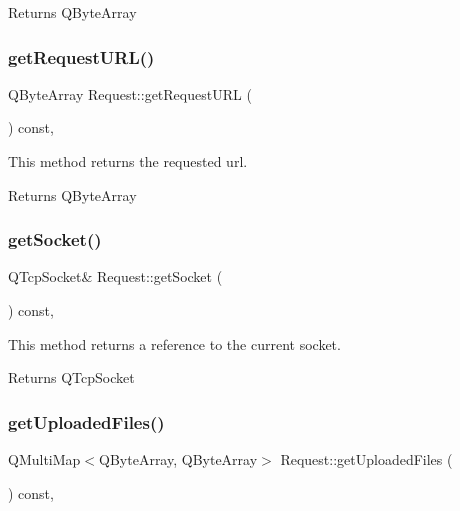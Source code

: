 \begin{DoxyReturn}{Returns}
Q\+Byte\+Array 
\end{DoxyReturn}
\mbox{\label{class_request_a48d3b2a3579011b0599e721fdb867b27}} 
\subsubsection{\texorpdfstring{get\+Request\+U\+R\+L()}{getRequestURL()}}
{\footnotesize\ttfamily Q\+Byte\+Array Request\+::get\+Request\+U\+RL (\begin{DoxyParamCaption}{ }\end{DoxyParamCaption}) const\hspace{0.3cm}{\ttfamily [inline]}, {\ttfamily [noexcept]}}



This method returns the requested url. 

\begin{DoxyReturn}{Returns}
Q\+Byte\+Array 
\end{DoxyReturn}
\mbox{\label{class_request_a0469d7af31664f37234397ce2cc46012}} 
\subsubsection{\texorpdfstring{get\+Socket()}{getSocket()}}
{\footnotesize\ttfamily Q\+Tcp\+Socket\& Request\+::get\+Socket (\begin{DoxyParamCaption}{ }\end{DoxyParamCaption}) const\hspace{0.3cm}{\ttfamily [inline]}, {\ttfamily [noexcept]}}



This method returns a reference to the current socket. 

\begin{DoxyReturn}{Returns}
Q\+Tcp\+Socket 
\end{DoxyReturn}
\mbox{\label{class_request_a61e5ed8f40ac13d028e27fda8695dace}} 
\subsubsection{\texorpdfstring{get\+Uploaded\+Files()}{getUploadedFiles()}}
{\footnotesize\ttfamily Q\+Multi\+Map$<$Q\+Byte\+Array, Q\+Byte\+Array$>$ Request\+::get\+Uploaded\+Files (\begin{DoxyParamCaption}{ }\end{DoxyParamCaption}) const\hspace{0.3cm}{\ttfamily [inline]}, {\ttfamily [noexcept]}}




